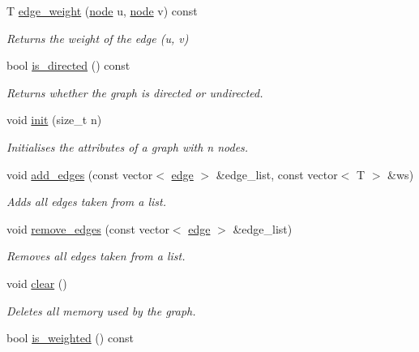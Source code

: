 \begin{DoxyCompactItemize}
T \hyperlink{classlgraph_1_1utils_1_1wdgraph_a1d86f87f61f47af9251945c14385c4e4}{edge\+\_\+weight} (\hyperlink{namespacelgraph_1_1utils_a7bd66ede3805ef121bc2835bd48de0cf}{node} u, \hyperlink{namespacelgraph_1_1utils_a7bd66ede3805ef121bc2835bd48de0cf}{node} v) const 
\begin{DoxyCompactList}\small\item\em Returns the weight of the edge ({\itshape u}, {\itshape v}) \end{DoxyCompactList}\item 
bool \hyperlink{classlgraph_1_1utils_1_1wdgraph_a5eee58626ec0aa8428436a859d601741}{is\+\_\+directed} () const 
\begin{DoxyCompactList}\small\item\em Returns whether the graph is directed or undirected. \end{DoxyCompactList}\item 
void \hyperlink{classlgraph_1_1utils_1_1wxgraph_a566ae9fe69209230ef159ed350ab8f7f}{init} (size\+\_\+t n)
\begin{DoxyCompactList}\small\item\em Initialises the attributes of a graph with {\itshape n} nodes. \end{DoxyCompactList}\item 
void \hyperlink{classlgraph_1_1utils_1_1wxgraph_a972a2483966f4b1d485c5d14157ee9be}{add\+\_\+edges} (const vector$<$ \hyperlink{namespacelgraph_1_1utils_a6510284ce1b1ae5dc97ce5d2de426e10}{edge} $>$ \&edge\+\_\+list, const vector$<$ T $>$ \&ws)
\begin{DoxyCompactList}\small\item\em Adds all edges taken from a list. \end{DoxyCompactList}\item 
void \hyperlink{classlgraph_1_1utils_1_1wxgraph_a4188b82f50e962b28c2c076b7978a854}{remove\+\_\+edges} (const vector$<$ \hyperlink{namespacelgraph_1_1utils_a6510284ce1b1ae5dc97ce5d2de426e10}{edge} $>$ \&edge\+\_\+list)
\begin{DoxyCompactList}\small\item\em Removes all edges taken from a list. \end{DoxyCompactList}\item 
void \hyperlink{classlgraph_1_1utils_1_1wxgraph_a421bc8166e35335445e45efc680ebe3f}{clear} ()
\begin{DoxyCompactList}\small\item\em Deletes all memory used by the graph. \end{DoxyCompactList}\item 
bool \hyperlink{classlgraph_1_1utils_1_1wxgraph_adda596cfbf72080d46ab445679fe092f}{is\+\_\+weighted} () const \hypertarget{classlgraph_1_1utils_1_1wxgraph_adda596cfbf72080d46ab445679fe092f}{}\label{classlgraph_1_1utils_1_1wxgraph_adda596cfbf72080d46ab445679fe092f}


\end{DoxyCompactItemize}
